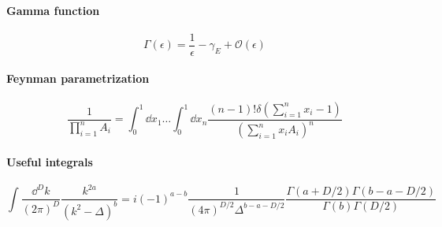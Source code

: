 
\paragraph{Gamma function}
\begin{equation*}
\Gamma(\epsilon) = \frac{1}{\epsilon} - \gamma_E + \mathcal{O}(\epsilon)
\end{equation*}

\paragraph{Feynman parametrization}
\begin{equation*}
\frac{1}{\prod_{i=1}^n A_i} = \int_0^1 \dd x_1 \ldots\int^1_0\dd x_n\frac{(n-1)!\delta(\sum_{i=1}^n x_i -1)}{(\sum_{i=1}^n x_i A_i)^n}
\end{equation*}

\paragraph{Useful integrals}
\begin{equation*}
\int\frac{\dd^D k}{(2\pi)^D}\frac{k^{2a}}{(k^2-\Delta)^b} = i(-1)^{a-b}\frac{1}{(4\pi)^{D/2}\Delta^{b-a-D/2}}\frac{\Gamma(a+D/2)\Gamma(b-a-D/2)}{\Gamma(b)\Gamma(D/2)}
\end{equation*}